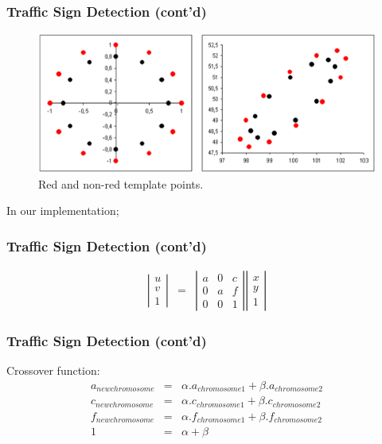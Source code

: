 \documentclass{beamer}
\begin{document}
\frame
{
  \frametitle{Traffic Sign Detection (cont'd)}
	\begin{figure}[ht]
	\begin{center}
	\includegraphics[width=.8\paperwidth]{../img/sdfig7.eps}
	\caption{Red and non-red template points.}
	\label{fig:sdfig7}
	\end{center}
	\end{figure}
}


\frame
{
	In our implementation;
  \frametitle{Traffic Sign Detection (cont'd)}
  \begin{eqnarray}
	\label{eq7}
	\left| \begin{array}{ccc} u \\ v \\ 1 \end{array} \right| &=& 
	\left| \begin{array}{ccc} a & 0 & c \\ 0 & a & f \\ 0 & 0 & 1 \end{array} \right| \left| \begin{array}{ccc} x \\ y \\ 1 \end{array} \right|
	\end{eqnarray}
}

\frame
{
  \frametitle{Traffic Sign Detection (cont'd)}
  Crossover function:
  \begin{eqnarray}
	\label{eq8}
	\nonumber a_{newchromosome}&=&\alpha.a_{chromosome1}+\beta.a_{chromosome2} \\
	c_{newchromosome}&=&\alpha.c_{chromosome1}+\beta.c_{chromosome2} \\
	\nonumber f_{newchromosome}&=&\alpha.f_{chromosome1}+\beta.f_{chromosome2} \\
	\nonumber 1&=&\alpha+\beta
	\end{eqnarray}
}
\end{document}
